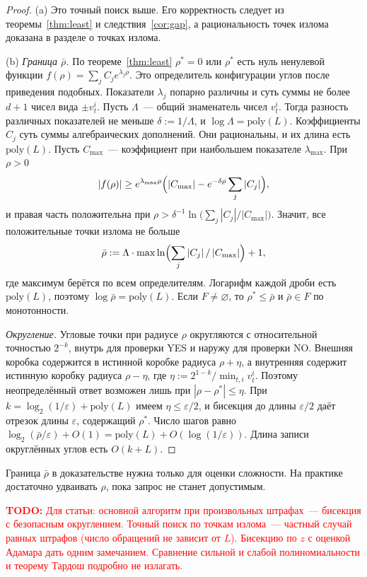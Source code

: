 \documentclass[a4paper,11pt]{article}
\theoremstyle{plain}
\theoremstyle{definition}
\theoremstyle{remark}
\newcommand{\abs}[1]{\left\lvert #1 \right\rvert}
\newcommand{\todo}[1]{\textcolor{red}{\textbf{TODO:} #1}}
\begin{document}
\begin{proof}
    (a) Это точный поиск выше. Его корректность следует из теоремы~\ref{thm:least} и следствия~\ref{cor:gap}, а рациональность точек излома доказана в разделе о точках излома.

    (b) \emph{Граница $\bar\rho$.} По теореме~\ref{thm:least} $\rho^*=0$ или $\rho^*$ есть нуль ненулевой функции $f(\rho)=\sum_jC_je^{\lambda_j\rho}$. Это определитель конфигурации углов после приведения подобных. Показатели $\lambda_j$ попарно различны и суть суммы не более $d+1$ чисел вида $\pm v^i_t$. Пусть $\Lambda$~--- общий знаменатель чисел $v^i_t$. Тогда разность различных показателей не меньше $\delta:=1/\Lambda$, и $\log\Lambda=\mathrm{poly}(L)$. Коэффициенты $C_j$ суть суммы алгебраических дополнений. Они рациональны, и их длина есть $\mathrm{poly}(L)$. Пусть $C_{\max}$~--- коэффициент при наибольшем показателе $\lambda_{\max}$. При $\rho>0$
    \[
        \abs{f(\rho)}\ge e^{\lambda_{\max}\rho}\Bigl(\abs{C_{\max}}-e^{-\delta\rho}\sum_{j}\abs{C_j}\Bigr),
    \]
    и правая часть положительна при $\rho>\delta^{-1}\ln\bigl(\sum_j\abs{C_j}/\abs{C_{\max}}\bigr)$. Значит, все положительные точки излома не больше
    \[
        \bar\rho:=\Lambda\cdot\max\ln\Bigl(\sum_j\abs{C_j}/\abs{C_{\max}}\Bigr)+1,
    \]
    где максимум берётся по всем определителям. Логарифм каждой дроби есть $\mathrm{poly}(L)$, поэтому $\log\bar\rho=\mathrm{poly}(L)$. Если $F\ne\varnothing$, то $\rho^*\le\bar\rho$ и $\bar\rho\in F$ по монотонности.

    \emph{Округление.} Угловые точки при радиусе $\rho$ округляются с относительной точностью $2^{-k}$, внутрь для проверки YES и наружу для проверки NO. Внешняя коробка содержится в истинной коробке радиуса $\rho+\eta$, а внутренняя содержит истинную коробку радиуса $\rho-\eta$, где $\eta:=2^{1-k}/\min_{t,i}v^i_t$. Поэтому неопределённый ответ возможен лишь при $\abs{\rho-\rho^*}\le\eta$. При $k=\log_2(1/\varepsilon)+\mathrm{poly}(L)$ имеем $\eta\le\varepsilon/2$, и бисекция до длины $\varepsilon/2$ даёт отрезок длины $\varepsilon$, содержащий $\rho^*$. Число шагов равно $\log_2(\bar\rho/\varepsilon)+O(1)=\mathrm{poly}(L)+O(\log(1/\varepsilon))$. Длина записи округлённых углов есть $O(k+L)$.
\end{proof}

Граница $\bar\rho$ в доказательстве нужна только для оценки сложности. На практике достаточно удваивать $\rho$, пока запрос не станет допустимым.

\todo{Для статьи: основной алгоритм при произвольных штрафах~--- бисекция с безопасным округлением. Точный поиск по точкам излома~--- частный случай равных штрафов (число обращений не зависит от $L$). Бисекцию по $z$ с оценкой Адамара дать одним замечанием. Сравнение сильной и слабой полиномиальности и теорему Тардош подробно не излагать.}
\end{document}
